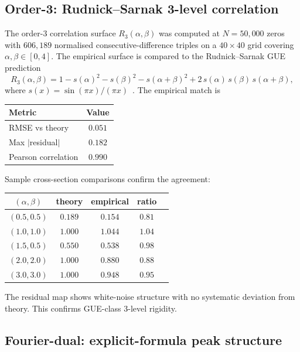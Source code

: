 \documentclass[11pt,a4paper]{article}
\theoremstyle{plain}
\theoremstyle{definition}
\theoremstyle{remark}
\begin{document}
\subsection{Order-3: Rudnick--Sarnak 3-level correlation}
\label{sec:tartini-r3}

The order-3 correlation surface $R_3(\alpha, \beta)$ was computed
at $N = 50{,}000$ zeros with $606{,}189$ normalised consecutive-difference
triples on a $40 \times 40$ grid covering $\alpha, \beta \in [0, 4]$.
The empirical surface is compared to the Rudnick--Sarnak GUE prediction
\begin{equation}
  R_3(\alpha, \beta) = 1 - s(\alpha)^2 - s(\beta)^2 - s(\alpha+\beta)^2
  + 2\,s(\alpha)\,s(\beta)\,s(\alpha+\beta),
  \label{eq:R3}
\end{equation}
where $s(x) = \sin(\pi x)/(\pi x)$~\cite{RudnickSarnak1996}.
The empirical match is

\begin{center}
\begin{tabular}{lc}
\toprule
Metric & Value \\
\midrule
RMSE vs theory & $0.051$ \\
Max $|$residual$|$ & $0.182$ \\
Pearson correlation & $0.990$ \\
\bottomrule
\end{tabular}
\end{center}

Sample cross-section comparisons confirm the agreement:

\begin{center}
\begin{tabular}{ccccc}
\toprule
$(\alpha, \beta)$ & theory & empirical & ratio \\
\midrule
$(0.5, 0.5)$ & $0.189$ & $0.154$ & $0.81$ \\
$(1.0, 1.0)$ & $1.000$ & $1.044$ & $1.04$ \\
$(1.5, 0.5)$ & $0.550$ & $0.538$ & $0.98$ \\
$(2.0, 2.0)$ & $1.000$ & $0.880$ & $0.88$ \\
$(3.0, 3.0)$ & $1.000$ & $0.948$ & $0.95$ \\
\bottomrule
\end{tabular}
\end{center}

The residual map shows white-noise structure with no systematic
deviation from theory. This confirms GUE-class 3-level rigidity.

\subsection{Fourier-dual: explicit-formula peak structure}
\label{sec:tartini-fourier}
\end{document}
